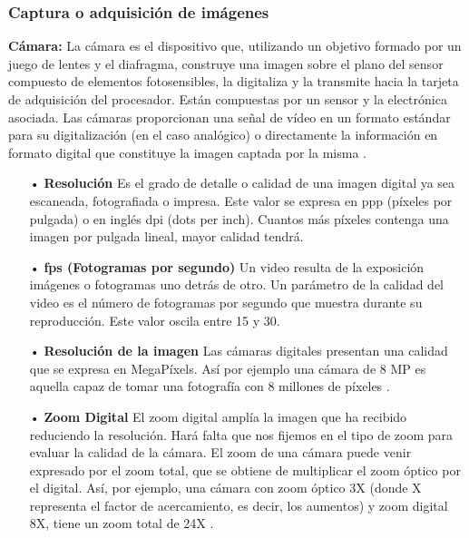 \subsubsection{Captura o adquisición de imágenes}
{\bf Cámara:} \vskip 0.1cm
La cámara es el dispositivo que, utilizando un objetivo formado por un juego de lentes y el diafragma, construye una imagen sobre el plano del sensor compuesto de elementos fotosensibles, la digitaliza y la transmite hacia la tarjeta de adquisición del procesador. Están compuestas por un sensor y la electrónica asociada. Las cámaras proporcionan una señal de vídeo en un formato estándar para su digitalización (en el caso analógico) o directamente la información en formato digital que constituye la imagen captada por la misma \citep{Enrique}.
\vskip 0.1cm


\begin{itemize}
\item[•] {\bf Resolución} \vskip 0.1cm
Es el grado de detalle o calidad de una imagen digital ya sea escaneada, fotografiada o impresa. Este valor se expresa en ppp (píxeles por pulgada) o en inglés dpi (dots per inch). Cuantos más píxeles contenga una imagen por pulgada lineal, mayor calidad tendrá.
\vskip 0.1cm


\item[•] {\bf fps (Fotogramas por segundo)} \vskip 0.1cm
Un video resulta de la exposición imágenes o fotogramas uno detrás de otro. Un parámetro de la calidad del video es el número de fotogramas por segundo que muestra durante su reproducción. Este valor oscila entre 15 y 30.
\vskip 0.1cm

\item[•] {\bf Resolución de la imagen} \vskip 0.1cm
Las cámaras digitales presentan una calidad que se expresa en MegaPíxels. Así por ejemplo una cámara de 8 MP es aquella capaz de tomar una fotografía con 8 millones de píxeles \citep{Web}. 
\vskip 0.1cm


\item[•] {\bf Zoom Digital} \vskip 0.1cm
El zoom digital amplía la imagen que ha recibido reduciendo la resolución. Hará falta que nos fijemos en el tipo de zoom para evaluar la calidad de la cámara. El zoom de una cámara puede venir expresado por el zoom total, que se obtiene de multiplicar el zoom óptico por el digital. Así, por ejemplo, una cámara con zoom óptico 3X (donde X representa el factor de acercamiento, es decir, los aumentos) y zoom digital 8X, tiene un zoom total de 24X \cite{Foto}.
\vskip 0.1cm
\end{itemize}

